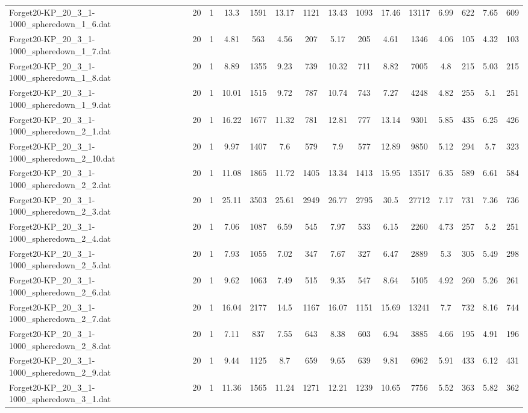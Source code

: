 \begin{table}[!ht]
{\begin{tabular}{lcccccccccccccc}
Forget20-KP\_20\_3\_1-1000\_spheredown\_1\_6.dat & 20 & 1 & 13.3 & 1591 & 13.17 & 1121 & 13.43 & 1093 & 17.46 & 13117 & 6.99 & 622 & 7.65 & 609 \\
Forget20-KP\_20\_3\_1-1000\_spheredown\_1\_7.dat & 20 & 1 & 4.81 & 563 & 4.56 & 207 & 5.17 & 205 & 4.61 & 1346 & 4.06 & 105 & 4.32 & 103 \\
Forget20-KP\_20\_3\_1-1000\_spheredown\_1\_8.dat & 20 & 1 & 8.89 & 1355 & 9.23 & 739 & 10.32 & 711 & 8.82 & 7005 & 4.8 & 215 & 5.03 & 215 \\
Forget20-KP\_20\_3\_1-1000\_spheredown\_1\_9.dat & 20 & 1 & 10.01 & 1515 & 9.72 & 787 & 10.74 & 743 & 7.27 & 4248 & 4.82 & 255 & 5.1 & 251 \\
Forget20-KP\_20\_3\_1-1000\_spheredown\_2\_1.dat & 20 & 1 & 16.22 & 1677 & 11.32 & 781 & 12.81 & 777 & 13.14 & 9301 & 5.85 & 435 & 6.25 & 426 \\
Forget20-KP\_20\_3\_1-1000\_spheredown\_2\_10.dat & 20 & 1 & 9.97 & 1407 & 7.6 & 579 & 7.9 & 577 & 12.89 & 9850 & 5.12 & 294 & 5.7 & 323 \\
Forget20-KP\_20\_3\_1-1000\_spheredown\_2\_2.dat & 20 & 1 & 11.08 & 1865 & 11.72 & 1405 & 13.34 & 1413 & 15.95 & 13517 & 6.35 & 589 & 6.61 & 584 \\
Forget20-KP\_20\_3\_1-1000\_spheredown\_2\_3.dat & 20 & 1 & 25.11 & 3503 & 25.61 & 2949 & 26.77 & 2795 & 30.5 & 27712 & 7.17 & 731 & 7.36 & 736 \\
Forget20-KP\_20\_3\_1-1000\_spheredown\_2\_4.dat & 20 & 1 & 7.06 & 1087 & 6.59 & 545 & 7.97 & 533 & 6.15 & 2260 & 4.73 & 257 & 5.2 & 251 \\
Forget20-KP\_20\_3\_1-1000\_spheredown\_2\_5.dat & 20 & 1 & 7.93 & 1055 & 7.02 & 347 & 7.67 & 327 & 6.47 & 2889 & 5.3 & 305 & 5.49 & 298 \\
Forget20-KP\_20\_3\_1-1000\_spheredown\_2\_6.dat & 20 & 1 & 9.62 & 1063 & 7.49 & 515 & 9.35 & 547 & 8.64 & 5105 & 4.92 & 260 & 5.26 & 261 \\
Forget20-KP\_20\_3\_1-1000\_spheredown\_2\_7.dat & 20 & 1 & 16.04 & 2177 & 14.5 & 1167 & 16.07 & 1151 & 15.69 & 13241 & 7.7 & 732 & 8.16 & 744 \\
Forget20-KP\_20\_3\_1-1000\_spheredown\_2\_8.dat & 20 & 1 & 7.11 & 837 & 7.55 & 643 & 8.38 & 603 & 6.94 & 3885 & 4.66 & 195 & 4.91 & 196 \\
Forget20-KP\_20\_3\_1-1000\_spheredown\_2\_9.dat & 20 & 1 & 9.44 & 1125 & 8.7 & 659 & 9.65 & 639 & 9.81 & 6962 & 5.91 & 433 & 6.12 & 431 \\
Forget20-KP\_20\_3\_1-1000\_spheredown\_3\_1.dat & 20 & 1 & 11.36 & 1565 & 11.24 & 1271 & 12.21 & 1239 & 10.65 & 7756 & 5.52 & 363 & 5.82 & 362 \\

\end{tabular}}
\end{table}
